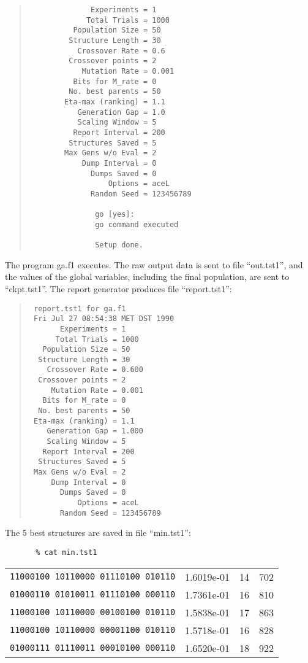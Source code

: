 \begin{quote}
\begin{verbatim}
              Experiments = 1
             Total Trials = 1000
          Population Size = 50
         Structure Length = 30
           Crossover Rate = 0.6
         Crossover points = 2
            Mutation Rate = 0.001
          Bits for M_rate = 0
         No. best parents = 50
        Eta-max (ranking) = 1.1
           Generation Gap = 1.0
           Scaling Window = 5
          Report Interval = 200
         Structures Saved = 5
        Max Gens w/o Eval = 2
            Dump Interval = 0
              Dumps Saved = 0
                  Options = aceL
              Random Seed = 123456789
 
               go [yes]:
               go command executed
 
               Setup done.
\end{verbatim}
\end{quote}
 
       The program ga.f1 executes.  The raw output data is sent  to
       file  ``out.tst1'',  and  the  values of the global variables,
       including the final population, are sent to ``ckpt.tst1''. The
       report generator produces file ``report.tst1'':

\begin{quote}
\begin{verbatim} 
 report.tst1 for ga.f1
 Fri Jul 27 08:54:38 MET DST 1990
       Experiments = 1
      Total Trials = 1000
   Population Size = 50
  Structure Length = 30
    Crossover Rate = 0.600
  Crossover points = 2
     Mutation Rate = 0.001
   Bits for M_rate = 0
  No. best parents = 50
 Eta-max (ranking) = 1.1
    Generation Gap = 1.000
    Scaling Window = 5
   Report Interval = 200
  Structures Saved = 5
 Max Gens w/o Eval = 2
     Dump Interval = 0
       Dumps Saved = 0
           Options = aceL
       Random Seed = 123456789
\end{verbatim}
\end{quote}


 
       The 5 best structures are saved in file ``min.tst1'':

\begin{verbatim} 
       % cat min.tst1
\end{verbatim}

\begin{center}
\begin{tabular}{rrrr}
\verb/11000100 10110000 01110100 010110/ &  1.6019e-01  &  14  & 702	\\
\verb/01000110 01010011 01110100 000110/ &  1.7361e-01  &  16  & 810	\\
\verb/11000100 10110000 00100100 010110/ &  1.5838e-01  &  17  & 863	\\
\verb/11000100 10110000 00001100 010110/ &  1.5718e-01  &  16  & 828	\\
\verb/01000111 01110011 00010100 000110/ &  1.6520e-01  &  18  & 922	\\
\end{tabular}
\end{center}
 
